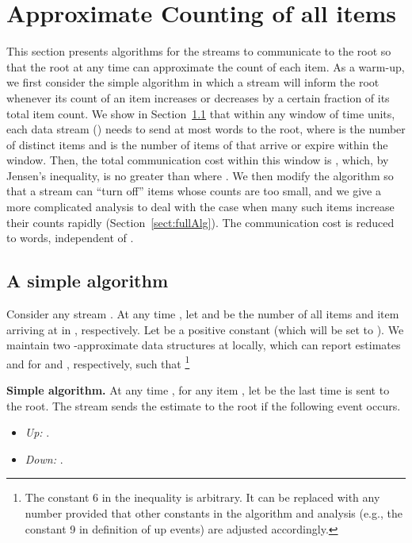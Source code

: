 \documentclass[proceedings]{stacs}
\theoremstyle{definition}\newtheorem{fact}{Fact}
\begin{document}
\section{Approximate Counting of all items}
\label{sec:fi}
This section presents algorithms for the streams to communicate to the root
so that the root at any time can approximate
the count of each item.
As a warm-up, we first consider the simple algorithm
in which a stream will inform the root
whenever its count of an item increases or decreases
by a certain fraction of its total item count.
  {We show
in Section~\ref{sect:simpleAlg} that within any window of  time units,
each data stream  () needs to send at most
 words to the
root, where  is the number of distinct items and 
is the number of items of  that arrive or expire within the
window.
Then, the total communication cost within this window is , which, by
Jensen's inequality, is no greater than 
where .}
We then modify the algorithm so that
a stream can ``turn off'' items whose counts are too small,
and we give a more complicated analysis
to deal with the case when many such items increase their counts rapidly
(Section~\ref{sect:fullAlg}).
The communication cost is reduced to  words,  {independent of .}



\subsection{A simple algorithm}
\label{sect:simpleAlg}
Consider any stream .  At any time ,
let  and  be the number of all items and item 
arriving at  in , respectively.
Let  be a positive constant
(which will be set to ).
We maintain two -approximate data structures \cite{DatarGIM02,LeeT06}
at  locally,
which can report estimates  and  for
 and , respectively,
such that
\footnote{
The constant 6 in the inequality is arbitrary.
It can be replaced with any number provided that
other constants in the algorithm and analysis
(e.g., the constant 9 in definition of up events)
are adjusted accordingly.
}



\vspace{.5ex}
\begin{center}
\begin{minipage}{.9\textwidth}
\hrulefill

{\bf Simple algorithm.}
At any time , for any item ,
let  be the last time  is sent
to the root. The stream sends the estimate 
to the root if the following event occurs.
\begin{itemize}
\item
{\it Up:}\hspace*{3.1ex}  .

\item
{\it Down:}  .
\end{itemize}
\vspace*{-.1in}
\hrulefill
\end{minipage}
\end{center}
\end{document}
